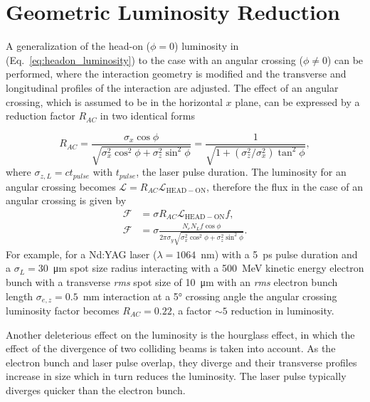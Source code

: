 \documentclass[../main.tex]{subfiles}
\begin{document}
\section{Geometric Luminosity Reduction}
\label{sec:geometric_luminosity_reduction}

A generalization of the head-on ($\phi = 0$) luminosity in (Eq.~\ref{eq:headon_luminosity}) to the case with an angular crossing ($\phi \neq 0$) can be performed, where the interaction geometry is modified and the transverse and longitudinal profiles of the interaction are adjusted. The effect of an angular crossing, which is assumed to be in the horizontal $x$ plane, can be expressed by a reduction factor $R_{AC}$ in two identical forms \cite{suzuki1976general,miyahara2008luminosity}

\begin{equation}
R_{AC} = \frac{\sigma_{x}\cos\phi}{\sqrt{\sigma_{x}^{2}\cos^{2}\phi+\sigma_{z}^{2}\sin^{2}\phi}} = \frac{1}{\sqrt{1+\left(\sigma_{z}^{2}/\sigma_{x}^{2}\right)\tan^{2}\phi}},
\label{eq:angular_crossing_factor}    
\end{equation}
where $\sigma_{z,L} = ct_{pulse}$ with $t_{pulse}$, the laser pulse duration. The luminosity for an angular crossing becomes $\mathcal{L} = R_{AC}\mathcal{L}_{\mathrm{HEAD-ON}}$, therefore the flux in the case of an angular crossing is given by 
\begin{align}
\mathcal{F} &= \sigma R_{AC}\mathcal{L}_{\mathrm{HEAD-ON}}f, \\
\mathcal{F} &= \sigma\frac{N_{e}N_{L}f\cos\phi}{2\pi\sigma_{y}\sqrt{\sigma_{x}^{2}\cos^{2}\phi + \sigma_{z}^{2}\sin^{2}\phi}}.
\label{eq:crossing_angle_flux}    
\end{align}
For example, for a Nd:YAG laser ($\lambda = 1064$~\si{\nano\meter}) with a 5~\si{\pico\second} pulse duration and a $\sigma_{L} = 30$~\si{\micro\meter} spot size radius interacting with a 500~\si{\mega\electronvolt} kinetic energy electron bunch with a transverse \textit{rms} spot size of 10~\si{\micro\meter} with an \textit{rms} electron bunch length $\sigma_{e,z} = 0.5$~\si{\milli\meter} interaction at a 5\si{\degree} crossing angle the angular crossing luminosity factor becomes $R_{AC} = 0.22$, a factor $\sim5$ reduction in luminosity.

Another deleterious effect on the luminosity is the hourglass effect, in which the effect of the divergence of two colliding beams is taken into account. As the electron bunch and laser pulse overlap, they diverge and their transverse profiles increase in size which in turn reduces the luminosity. The laser pulse typically diverges quicker than the electron bunch. 
\end{document}

